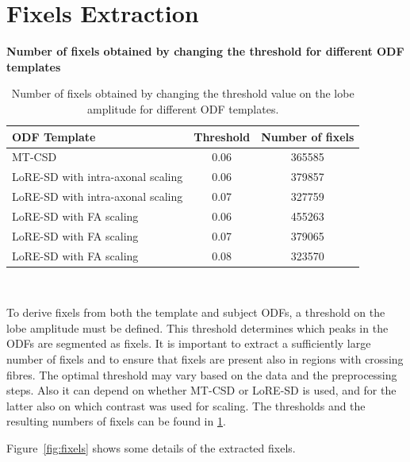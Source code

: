\section{Fixels Extraction}
\label{sec:extract}

\begin{table}[H]
    \caption*{\textbf{Number of fixels obtained by changing the threshold for different ODF templates}} %
    \centering 
    \begin{tabular}{|l c c|}
    \hline
    \rowcolor{bluepoli!40}
    \textbf{ODF Template} & \textbf{Threshold} & \textbf{Number of fixels} \T\B \\
    \hline \hline
    MT-CSD & 0.06 & 365585 \T\B \\
    LoRE-SD with intra-axonal scaling & 0.06 & 379857 \T\B \\
    LoRE-SD with intra-axonal scaling & 0.07 & 327759 \T\B \\
    LoRE-SD with FA scaling & 0.06 & 455263 \T\B \\
    LoRE-SD with FA scaling & 0.07 & 379065 \T\B \\
    LoRE-SD with FA scaling & 0.08 & 323570 \B \\
    \hline
    \end{tabular}
    \\[10pt]
    \caption{Number of fixels obtained by changing the threshold value on the lobe amplitude for different ODF templates.}
    \label{tab:fixels}
\end{table}


To derive fixels from both the template and subject ODFs, a threshold on the lobe amplitude must be defined. This threshold determines which peaks in the ODFs are segmented as fixels. It is important to extract a sufficiently large number of fixels and to ensure that fixels are present also in regions with crossing fibres. The optimal threshold may vary based on the data and the preprocessing steps. Also it can depend on whether MT-CSD or LoRE-SD is used, and for the latter also on which contrast was used for scaling. The thresholds and the resulting numbers of fixels can be found in \cref{tab:fixels}. 

Figure~\ref{fig:fixels} shows some details of the extracted fixels.

